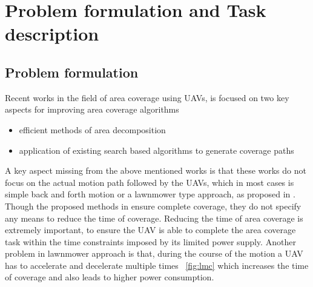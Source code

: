 \section{Problem formulation and Task description}
\subsection{Problem formulation}

Recent works in the field of area coverage using UAVs, is focused on two key aspects for improving area coverage algorithms
\begin{itemize}
\item efficient methods of area decomposition \cite{2,4,6}
\item application of existing search based algorithms to generate coverage paths \cite{7,8,9,10}
\end{itemize}

A key aspect missing from the above mentioned works is that these works do not focus on the actual motion path followed by the UAVs, which in most cases is simple back and forth motion or a lawnmower type approach, as proposed in \cite{1}. Though the proposed methods in \cite{2,4,6,7,8,9,10} ensure complete coverage, they do not specify any means to reduce the time of coverage. Reducing the time of area coverage is extremely important, to ensure the UAV is able to complete the area coverage task within the time constraints imposed by its limited power supply. Another problem in lawnmower approach is that, during the course of the motion a UAV has to accelerate and decelerate multiple times ~\ref{fig:lmc} which increases the time of coverage and also leads to higher power consumption. \\

